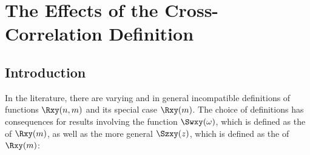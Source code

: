 \chapter{The Effects of the Cross-Correlation Definition}
\label{app:xcordef}
\section{Introduction}
In the literature, there are varying and in general incompatible definitions of
 functions $\Rxy(n,m)$ and its  special case $\Rxy(m)$. %
The choice of definitions has consequences for results involving the  function
$\Swxy(\omega)$, %
which is defined as the  of $\Rxy(m)$,
as well as the more general $\Szxy(z)$,
which is defined as the  of $\Rxy(m)$:
\begin{definition}\label{def:Swxy_xcor}\label{def:Szxy_xcor}
\end{definition}

